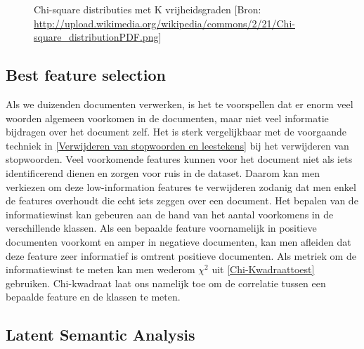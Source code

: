 \begin{figure}[h]%
    \centering
    \caption{Chi-square distributies met K vrijheidsgraden [Bron: \url{http://upload.wikimedia.org/wikipedia/commons/2/21/Chi-square_distributionPDF.png}]}%
\end{figure}

\subsection{Best feature selection}\label{Low-information feature el}

Als we duizenden documenten verwerken, is het te voorspellen dat er enorm veel woorden algemeen voorkomen in de documenten, maar niet veel informatie bijdragen over het document zelf. Het is sterk vergelijkbaar met de voorgaande techniek in \ref{Verwijderen van stopwoorden en leestekens} bij het verwijderen van stopwoorden. Veel voorkomende features kunnen voor het document niet als iets identificerend dienen en zorgen voor ruis in de dataset. Daarom kan men verkiezen om deze low-information features te verwijderen zodanig dat men enkel de features overhoudt die echt iets zeggen over een document. Het bepalen van de informatiewinst kan gebeuren aan de hand van het aantal voorkomens in de verschillende klassen. Als een bepaalde feature voornamelijk in positieve documenten voorkomt en amper in negatieve documenten, kan men afleiden dat deze feature zeer informatief is omtrent positieve documenten. Als metriek om de informatiewinst te meten kan men wederom ${\chi}^2$ uit \ref{Chi-Kwadraattoest} gebruiken. Chi-kwadraat laat ons namelijk toe om de correlatie tussen een bepaalde feature en de klassen te meten.
%
\subsection{Latent Semantic Analysis}\label{Latent Semantic Analysis}

